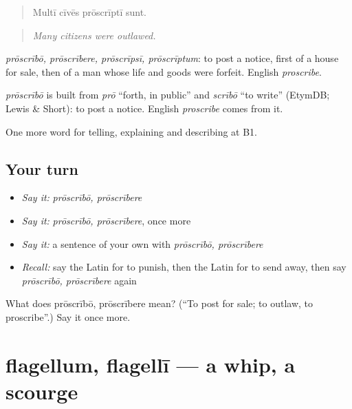 \begin{quote}
Multī cīvēs prōscrīptī sunt.
\end{quote}

\begin{quote}
\emph{Many citizens were outlawed.}
\end{quote}

\emph{prōscrībō, prōscrībere, prōscrīpsī, prōscrīptum}: to post a notice, first of a house for sale, then of a man whose life and goods were forfeit. English \emph{proscribe}.

\begin{cousinweb}
\emph{prōscrībō} is built from \emph{prō} \textquotedblleft{}forth, in public\textquotedblright{} and \emph{scrībō} \textquotedblleft{}to write\textquotedblright{} (EtymDB; Lewis \& Short): to post a notice. English \emph{proscribe} comes from it.
\end{cousinweb}

\begin{grammarlens}[title={What you've built}]
One more word for telling, explaining and describing at B1.
\end{grammarlens}

\subsection*{Your turn}
\begin{itemize}
\raggedright
  \item \emph{Say it:} \emph{prōscrībō, prōscrībere}
  \item \emph{Say it:} \emph{prōscrībō, prōscrībere}, once more
  \item \emph{Say it:} a sentence of your own with \emph{prōscrībō, prōscrībere}
  \item \emph{Recall:} say the Latin for to punish, then the Latin for to send away, then say \emph{prōscrībō, prōscrībere} again
\end{itemize}

\begin{tcolorbox}[breakable,colback=teal!4,colframe=teal!35!black,title={Before you move on}]
What does prōscrībō, prōscrībere mean? (\textquotedblleft{}To post for sale; to outlaw, to proscribe\textquotedblright{}.) Say it once more.
\end{tcolorbox}
\section[flagellum, flagellī]{flagellum, flagellī — a whip, a scourge}

